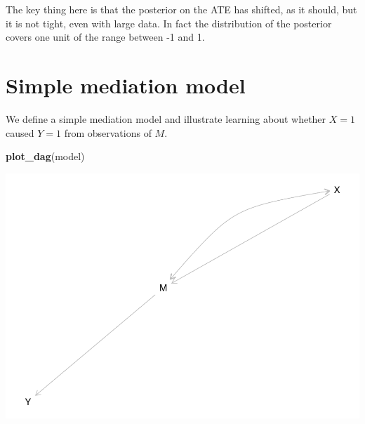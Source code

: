 \documentclass[12pt,]{book}
\newenvironment{Shaded}{\begin{snugshade}}{\end{snugshade}}
\newcommand{\DataTypeTok}[1]{\textcolor[rgb]{0.13,0.29,0.53}{#1}}
\newcommand{\DecValTok}[1]{\textcolor[rgb]{0.00,0.00,0.81}{#1}}
\newcommand{\FloatTok}[1]{\textcolor[rgb]{0.00,0.00,0.81}{#1}}
\newcommand{\KeywordTok}[1]{\textcolor[rgb]{0.13,0.29,0.53}{\textbf{#1}}}
\newcommand{\NormalTok}[1]{#1}
\newcommand{\OperatorTok}[1]{\textcolor[rgb]{0.81,0.36,0.00}{\textbf{#1}}}
\newcommand{\StringTok}[1]{\textcolor[rgb]{0.31,0.60,0.02}{#1}}
\begin{document}
The key thing here is that the posterior on the ATE has shifted, as it should, but it is not tight, even with large data. In fact the distribution of the posterior covers one unit of the range between -1 and 1.

\hypertarget{simple-mediation-model}{%
\section{Simple mediation model}\label{simple-mediation-model}}

We define a simple mediation model and illustrate learning about whether \(X=1\) caused \(Y=1\) from observations of \(M\).

\begin{Shaded}
\end{Shaded}

\begin{Shaded}
\begin{Highlighting}[]
\KeywordTok{plot_dag}\NormalTok{(model)}
\end{Highlighting}
\end{Shaded}

\includegraphics{ii_files/figure-latex/unnamed-chunk-112-1.pdf}
\end{document}
